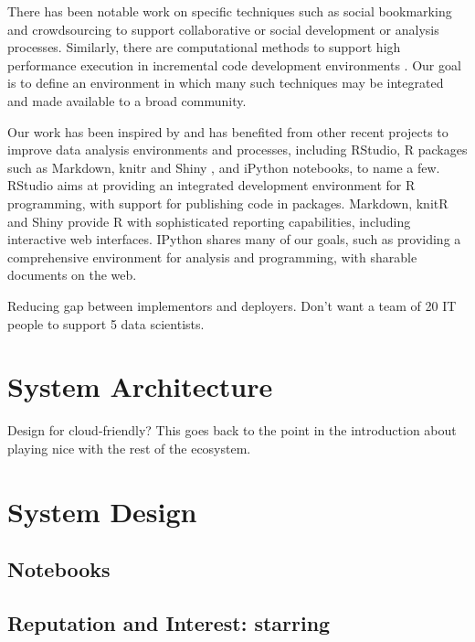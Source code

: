 \documentclass[review,journal]{vgtc}         %
\begin{document}
There has been notable work on specific techniques such as
social bookmarking \cite{Millen:2006:DSB} \cite{Heer:2007:VAV}
and crowdsourcing \cite{Fast:2014:ECS} to support collaborative
or social development or analysis processes.
Similarly, there are computational methods to support high
performance execution in incremental code development
environments \cite{Guo:2010:TPI}.
Our goal is to define an environment in which many such
techniques may be integrated and made available to a broad community.

\cite{Santos:2009:VST}

\cite{Mates:2011:CSA}

\cite{Keim:2008:VAS}

Our work has been inspired by and has benefited from other recent projects
to improve data analysis environments and processes, including RStudio,
R packages such as Markdown, knitr and Shiny \cite{CRAN}, and iPython notebooks,
to name a few. RStudio aims at providing an integrated development environment
for R programming, with support for publishing code in packages. Markdown,
knitR and Shiny provide R with sophisticated reporting capabilities, including
interactive web interfaces. IPython \cite{Perez:2007:IAS}
shares many of our goals, such as providing a comprehensive environment
for analysis and programming, with sharable documents on the web.

Reducing gap between implementors and deployers. Don't want a team of
20 IT people to support 5 data scientists.


\section{System Architecture}

Design for cloud-friendly? This goes back to the point in the
introduction about playing nice with the rest of the ecosystem.

\section{System Design}

\subsection{Notebooks\label{sec:notebooks}}

\subsection{Reputation and Interest: starring\label{sec:starring}}
\end{document}
